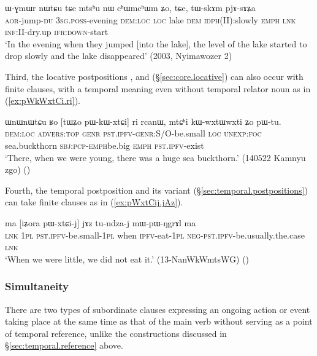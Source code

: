  \begin{exe}
\ex \label{ex:pWnWmdarndZi.WGmWr}
 ɯ-ɣmɯr nɯtɕu tɕe  mtsʰu nɯ cʰɯmcʰɯm ʑo, tɕe, tɯ-skɤm pjɤ-sɤʑa \\
\textsc{aor}-jump-\textsc{du} \textsc{3sg}.\textsc{poss}-evening \textsc{dem}:\textsc{loc} \textsc{loc} lake \textsc{dem} \textsc{idph}(II):slowly \textsc{emph} \textsc{lnk} \textsc{inf}:II-dry.up \textsc{ifr}:\textsc{down}-start \\
\glt `In the evening when they jumped [into the lake], the level of the lake started to drop slowly and the lake disappeared' (2003, Nyimawozer 2)
\end{exe}

Third, the locative postpositions ,  and  (§\ref{sec:core.locative}) can also occur with finite clauses, with a temporal meaning even without temporal relator noun as in (\ref{ex:pWkWxtCi.ri}).

 \begin{exe}
\ex \label{ex:pWkWxtCi.ri}
\gll  ɯnɯnɯtɕu ʁo [tɯʑo pɯ-kɯ-xtɕi] ri rcanɯ, mtɕʰi kɯ-wxtɯ\redp{}wxti ʑo pɯ-tu. \\
\textsc{dem}:\textsc{loc} \textsc{advers}:\textsc{top} \textsc{genr} \textsc{pst}.\textsc{ipfv}-\textsc{genr}:S/O-be.small \textsc{loc} \textsc{unexp}:\textsc{foc} sea.buckthorn \textsc{sbj}:\textsc{pcp}-\textsc{emph}\redp{}be.big \textsc{emph} \textsc{pst}.\textsc{ipfv}-exist \\
\glt `There, when we were young, there was a huge sea buckthorn.' (140522 Kamnyu zgo)
()
 \end{exe}
 
Fourth, the temporal postposition    and its variant  (§\ref{sec:temporal.postpositions}) can take finite clauses as in (\ref{ex:pWxtCij.jAz}).
    
 \begin{exe}
\ex \label{ex:pWxtCij.jAz}
\gll ma [iʑora pɯ-xtɕi-j] jɤz  tu-ndza-j mɯ-pɯ-ŋgrɤl ma \\
\textsc{lnk} \textsc{1pl} \textsc{pst}.\textsc{ipfv}-be.small-\textsc{1pl} when \textsc{ipfv}-eat-\textsc{1pl} \textsc{neg}-\textsc{pst}.\textsc{ipfv}-be.usually.the.case \textsc{lnk} \\
\glt `When we were little, we did not eat it.' (13-NanWkWmtsWG)
()
 \end{exe}

 
\subsubsection{Simultaneity} \label{sec:simultaneity}
 There are two types of subordinate clauses expressing an ongoing action or event taking place at the same time as that of the main verb without serving as a point of temporal reference, unlike the constructions discussed in §\ref{sec:temporal.reference} above.

